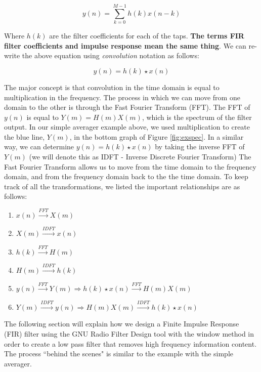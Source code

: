 $$y(n) = \sum_{k=0}^{M-1}  h(k)x(n-k)$$

Where $h(k)$ are the filter coefficients for each of the taps.  \textbf{The terms FIR filter coefficients and impulse response mean the same thing}\cite{lyons:intro}.  We can re-write the above equation using \textit{convolution} notation as follows: 

$$y(n) = h(k) \star x(n)$$  

The major concept is that convolution in the time domain is equal to multiplication in the frequency.  The process in which we can move from one domain to the other is through the Fast Fourier Transform (FFT).  The FFT of $y(n)$ is equal to $Y(m) = H(m) X(m)$, which is the spectrum of the filter output.  In our simple averager example above, we used multiplication to create the blue line, $Y(m)$, in the bottom graph of Figure \ref{fig:exspec}.  In a similar way, we can determine $y(n) = h(k)\star x(n)$ by taking the inverse FFT of $Y(m)$ (we will denote this as IDFT - Inverse Discrete Fourier Transform)\cite{lyons:intro}  The Fast Fourier Transform allows us to move from the time domain to the frequency domain, and from the frequency domain back to the the time domain.  To keep track of all the transformations, we listed the important relationships are as follows: \\

\begin{enumerate}
\item $x(n) \overset{FFT}{\longrightarrow} X(m)$
\item $X(m) \overset{IDFT}{\longrightarrow} x(n)$
\item $h(k) \overset{FFT}{\longrightarrow} H(m)$
\item $H(m) \overset{IDFT}{\longrightarrow} h(k)$
\item $y(n) \overset{FFT}{\longrightarrow} Y(m) \Rightarrow h(k)\star x(n) \overset{FFT}{\longrightarrow} H(m) X(m)$
\item $Y(m) \overset{IDFT}{\longrightarrow} y(n) \Rightarrow H(m) X(m) \overset{IDFT}{\longrightarrow} h(k)\star x(n)$\\
\end{enumerate}    

The following section will explain how we design a Finite Impulse Response (FIR) filter using the GNU Radio Filter Design tool with the window method in order to create a low pass filter that removes high frequency information content.  The process ``behind the scenes" is similar to the example with the simple averager.  

